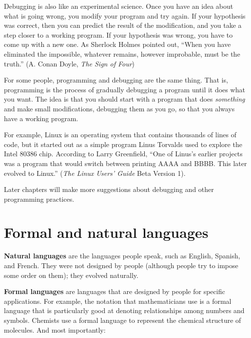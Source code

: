 \documentclass[10pt]{book}
\begin{document}
Debugging is also like an experimental science.  Once you have an idea
about what is going wrong, you modify your program and try again.  If
your hypothesis was correct, then you can predict the result of the
modification, and you take a step closer to a working program.  If
your hypothesis was wrong, you have to come up with a new one.  As
Sherlock Holmes pointed out, ``When you have eliminated the
impossible, whatever remains, however improbable, must be the truth.''
(A. Conan Doyle, {\em The Sign of Four})


For some people, programming and debugging are the same thing.  That
is, programming is the process of gradually debugging a program until
it does what you want.  The idea is that you should start with a
program that does {\em something} and make small modifications,
debugging them as you go, so that you always have a working program.

For example, Linux is an operating system that contains thousands of
lines of code, but it started out as a simple program Linus Torvalds
used to explore the Intel 80386 chip.  According to Larry Greenfield,
``One of Linus's earlier projects was a program that would switch
between printing AAAA and BBBB.  This later evolved to Linux.''
({\em The Linux Users' Guide} Beta Version 1).


Later chapters will make more suggestions about debugging and other
programming practices.

\section{Formal and natural languages}

{\bf Natural languages} are the languages people speak,
such as English, Spanish, and French.  They were not designed
by people (although people try to impose some order on them);
they evolved naturally.

{\bf Formal languages} are languages that are designed by people for
specific applications.  For example, the notation that mathematicians
use is a formal language that is particularly good at denoting
relationships among numbers and symbols.  Chemists use a formal
language to represent the chemical structure of molecules.  And
most importantly:
\end{document}
